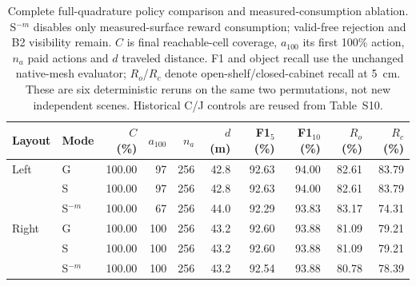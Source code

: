 \begin{table}[!htbp]
\centering\small\setlength{\tabcolsep}{3.1pt}
\caption{Complete full-quadrature policy comparison and measured-consumption ablation. S$^{-m}$ disables only measured-surface reward consumption; valid-free rejection and B2 visibility remain. $C$ is final reachable-cell coverage, $a_{100}$ its first 100\% action, $n_a$ paid actions and $d$ traveled distance. F1 and object recall use the unchanged native-mesh evaluator; $R_o$/$R_c$ denote open-shelf/closed-cabinet recall at 5~cm. These are six deterministic reruns on the same two permutations, not new independent scenes. Historical C/J controls are reused from Table~S10.}
\label{tab:clean-consumption-policy}
\begin{tabular}{llrrrrrrrr}
\toprule
Layout & Mode & $C$ (\%) & $a_{100}$ & $n_a$ & $d$ (m) & F1$_5$ (\%) & F1$_{10}$ (\%) & $R_o$ (\%) & $R_c$ (\%) \\
\midrule
Left & G & 100.00 & 97 & 256 & 42.8 & 92.63 & 94.00 & 82.61 & 83.79 \\
 & S & 100.00 & 97 & 256 & 42.8 & 92.63 & 94.00 & 82.61 & 83.79 \\
 & S$^{-m}$ & 100.00 & 67 & 256 & 44.0 & 92.29 & 93.83 & 83.17 & 74.31 \\
\midrule
Right & G & 100.00 & 100 & 256 & 43.2 & 92.60 & 93.88 & 81.09 & 79.21 \\
 & S & 100.00 & 100 & 256 & 43.2 & 92.60 & 93.88 & 81.09 & 79.21 \\
 & S$^{-m}$ & 100.00 & 100 & 256 & 43.2 & 92.54 & 93.88 & 80.78 & 78.39 \\
\bottomrule
\end{tabular}
\end{table}
